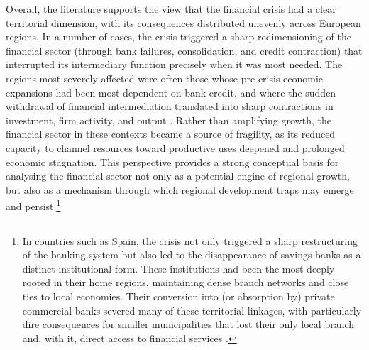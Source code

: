 \documentclass[a4paper,11pt,oneside]{article}
\begin{document}


Overall, the literature supports the view that the financial crisis had a clear territorial dimension, with its consequences distributed unevenly across European regions. In a number of cases, the crisis triggered a sharp redimensioning of the financial sector (through bank failures, consolidation, and credit contraction) that interrupted its intermediary function precisely when it was most needed. The regions most severely affected were often those whose pre-crisis economic expansions had been most dependent on bank credit, and where the sudden withdrawal of financial intermediation translated into sharp contractions in investment, firm activity, and output \citep{chodorow2014employment,martin2011local}. Rather than amplifying growth, the financial sector in these contexts became a source of fragility, as its reduced capacity to channel resources toward productive uses deepened and prolonged economic stagnation. This perspective provides a strong conceptual basis for analysing the financial sector not only as a potential engine of regional growth, but also as a mechanism through which regional development traps may emerge and persist.\footnote{In countries such as Spain, the crisis not only triggered a sharp restructuring of the banking system but also led to the disappearance of savings banks as a distinct institutional form. These institutions had been the most deeply rooted in their home regions, maintaining dense branch networks and close ties to local economies. Their conversion into (or absorption by) private commercial banks severed many of these territorial linkages, with particularly dire consequences for smaller municipalities that lost their only local branch and, with it, direct access to financial services \citep{bernad2008deregulation,alama2012bank,alama2015geography,prior2019profit,illueca2008liberalization,martin2019financial}.}
\end{document}
